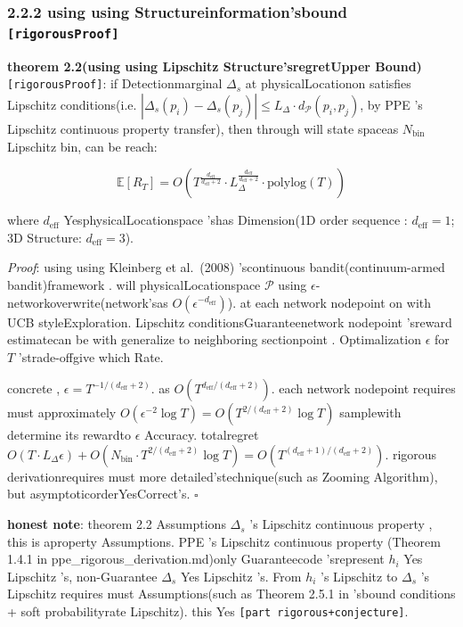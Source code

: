 \documentclass[
  12pt,
]{article}
\begin{document}
\subsubsection{\texorpdfstring{2.2.2 using using Structureinformation'sbound 
\texttt{{[}rigorousProof{]}}}{2.2.2 using using Structureinformation'sbound  {[}rigorousProof{]}}}\label{ux5229ux7528ux7ed3ux6784ux4fe1ux606fux7684ux6539ux8fdbux754c-ux4e25ux683cux8bc1ux660e}

\textbf{theorem  2.2(using using  Lipschitz Structure'sregretUpper Bound)}
\texttt{{[}rigorousProof{]}}: if Detectionmarginal \(\Delta_s\) at physicalLocationon satisfies 
Lipschitz conditions(i.e.
\(|\Delta_s(p_i) - \Delta_s(p_j)| \leq L_\Delta \cdot d_{\mathcal{P}}(p_i, p_j)\), by 
PPE 's Lipschitz continuous property transfer), then through will state spaceas  \(N_{\text{bin}}\)
 Lipschitz bin, can be reach: 

\[\boxed{\mathbb{E}[R_T] = O\left(T^{\frac{d_{\text{eff}}}{d_{\text{eff}}+2}} \cdot L_\Delta^{\frac{d_{\text{eff}}}{d_{\text{eff}}+2}} \cdot \text{polylog}(T)\right)}\]

where \(d_{\text{eff}}\) YesphysicalLocationspace 'shas Dimension(1D
order sequence : \(d_{\text{eff}} = 1\); 3D Structure: \(d_{\text{eff}} = 3\)). 

\emph{Proof}: using using  Kleinberg et al.~(2008)
'scontinuous bandit(continuum-armed bandit)framework . will physicalLocationspace 
\(\mathcal{P}\) using  \(\epsilon\)-networkoverwrite(network'sas 
\(O(\epsilon^{-d_{\text{eff}}})\)). at each network nodepoint on with  UCB
styleExploration. Lipschitz conditionsGuaranteenetwork nodepoint 'sreward estimatecan be with generalize to neighboring sectionpoint . Optimalization 
\(\epsilon\) for  \(T\) 'strade-offgive which Rate. 

concrete ,  \(\epsilon = T^{-1/(d_{\text{eff}}+2)}\). as 
\(O(T^{d_{\text{eff}}/(d_{\text{eff}}+2)})\). each network nodepoint requires must approximately
\(O(\epsilon^{-2} \log T) = O(T^{2/(d_{\text{eff}}+2)} \log T)\)
samplewith determine its rewardto  \(\epsilon\) Accuracy. totalregret
\(O(T \cdot L_\Delta \epsilon) + O(N_{\text{bin}} \cdot T^{2/(d_{\text{eff}}+2)} \log T) = O(T^{(d_{\text{eff}}+1)/(d_{\text{eff}}+2)})\). rigorous derivationrequires must more detailed'stechnique(such as 
Zooming Algorithm), but asymptoticorderYesCorrect's. \(\square\)

\textbf{honest note}: theorem  2.2 Assumptions \(\Delta_s\) 's Lipschitz
continuous property , this is aproperty Assumptions. PPE 's Lipschitz continuous property (Theorem 1.4.1 in
ppe\_rigorous\_derivation.md)only Guaranteecode 'srepresent \(h_i\) Yes Lipschitz
's, non-Guarantee \(\Delta_s\) Yes Lipschitz 's. From \(h_i\) 's Lipschitz to 
\(\Delta_s\) 's Lipschitz requires must Assumptions(such as  Theorem 2.5.1 in 'sbound conditions +
soft probabilityrate  Lipschitz). this Yes \texttt{{[}part rigorous+conjecture{]}}. 
\end{document}
